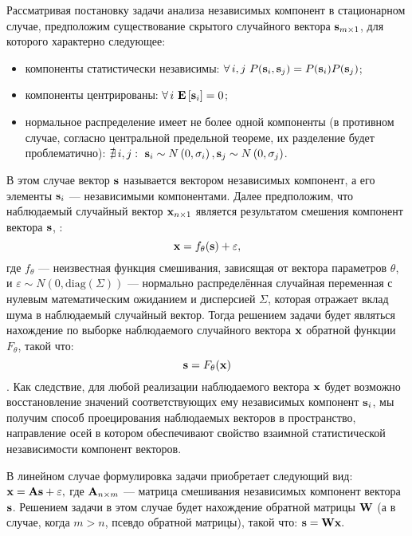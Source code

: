 Рассматривая постановку задачи анализа независимых компонент в стационарном случае, предположим существование скрытого случайного вектора $\mathrm{\mathbf{s}}_{m \times 1}$, для которого характерно следующее:
\begin{itemize}
    \item компоненты статистически независимы: $\forall\, i,j\ P(\mathrm{\mathbf{s}}_{i}, \mathrm{\mathbf{s}}_{j}) = P(\mathrm{\mathbf{s}}_{i}) P(\mathrm{\mathbf{s}}_{j})$;
    \item компоненты центрированы: $\forall\, i\ \expectation{\vector{s}_{i}} = 0$;
    \item нормальное распределение имеет не более одной компоненты (в противном случае, согласно центральной предельной теореме, их разделение будет проблематично): $\nexists\, i,j:\ \vector{s}_{i} \sim N\left(0, \sigma_{i}\right), \vector{s}_{j} \sim N\left(0, \sigma_{j}\right)$.
\end{itemize}
В этом случае вектор $\mathrm{\mathbf{s}}$ называется вектором независимых компонент, а его элементы $\mathrm{\mathbf{s}}_{i}$ --- независимыми компонентами. Далее предположим, что наблюдаемый случайный вектор $\mathrm{\mathbf{x}}_{n \times 1}$ является результатом смешения компонент вектора $\mathrm{\mathbf{s}}$, \ie: $$\mathrm{\mathbf{x}} = f_{\theta}(\mathrm{\mathbf{s}}) + \mathrm{\mathbf{\varepsilon}},$$ где $f_{\theta}$ --- неизвестная функция смешивания, зависящая от вектора параметров $\theta$, и $\varepsilon \sim N\left(0, \text{diag}\left(\Sigma\right)\right)$ --- нормально распределённая случайная переменная с нулевым математическим ожиданием и дисперсией $\Sigma$, которая отражает вклад шума в наблюдаемый случайный вектор. Тогда решением задачи будет являться нахождение по выборке наблюдаемого случайного вектора $\mathrm{\mathbf{x}}$ обратной функции $F_{\theta}$, такой что: $$\mathrm{\mathbf{s}} = F_{\theta}(\mathrm{\mathbf{x}})$$. Как следствие, для любой реализации наблюдаемого вектора $\mathrm{\mathbf{x}}$ будет возможно восстановление значений соответствующих ему независимых компонент $\mathrm{\mathbf{s}}_{i}$, \ie мы получим способ проецирования наблюдаемых векторов в пространство, направление осей в котором обеспечивают свойство взаимной статистической независимости компонент векторов.

В линейном случае формулировка задачи приобретает следующий вид: $\mathrm{\mathbf{x}} = \mathrm{\mathbf{A}} \mathrm{\mathbf{s}} + \varepsilon,$ где $\mathrm{\mathbf{A}}_{n \times m}$ --- матрица смешивания независимых компонент вектора $\mathrm{\mathbf{s}}$. Решением задачи в этом случае будет нахождение обратной матрицы $\mathrm{\mathbf{W}}$ (а в случае, когда $m > n$, псевдо обратной матрицы), такой что: $\mathrm{\mathbf{s}} = \mathrm{\mathbf{W}} \mathrm{\mathbf{x}}.$

